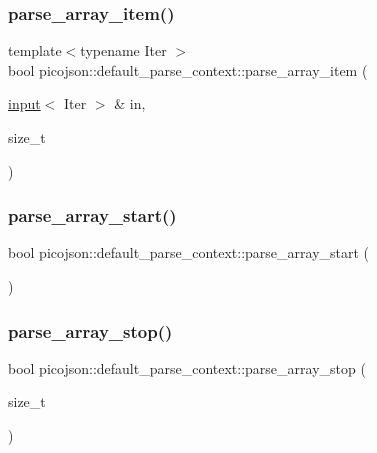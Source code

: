 \subsubsection{\texorpdfstring{parse\+\_\+array\+\_\+item()}{parse\_array\_item()}}
{\footnotesize\ttfamily template$<$typename Iter $>$ \\
bool picojson\+::default\+\_\+parse\+\_\+context\+::parse\+\_\+array\+\_\+item (\begin{DoxyParamCaption}\item[{\hyperlink{classpicojson_1_1input}{input}$<$ Iter $>$ \&}]{in,  }\item[{size\+\_\+t}]{ }\end{DoxyParamCaption})\hspace{0.3cm}{\ttfamily [inline]}}

\hypertarget{classpicojson_1_1default__parse__context_a5c355f843ceacde134997f5bbbda1d23}{}\label{classpicojson_1_1default__parse__context_a5c355f843ceacde134997f5bbbda1d23} 
\subsubsection{\texorpdfstring{parse\+\_\+array\+\_\+start()}{parse\_array\_start()}}
{\footnotesize\ttfamily bool picojson\+::default\+\_\+parse\+\_\+context\+::parse\+\_\+array\+\_\+start (\begin{DoxyParamCaption}{ }\end{DoxyParamCaption})\hspace{0.3cm}{\ttfamily [inline]}}

\hypertarget{classpicojson_1_1default__parse__context_aa6ac46d87d620377429438675ba9fab2}{}\label{classpicojson_1_1default__parse__context_aa6ac46d87d620377429438675ba9fab2} 
\subsubsection{\texorpdfstring{parse\+\_\+array\+\_\+stop()}{parse\_array\_stop()}}
{\footnotesize\ttfamily bool picojson\+::default\+\_\+parse\+\_\+context\+::parse\+\_\+array\+\_\+stop (\begin{DoxyParamCaption}\item[{size\+\_\+t}]{ }\end{DoxyParamCaption})\hspace{0.3cm}{\ttfamily [inline]}}

